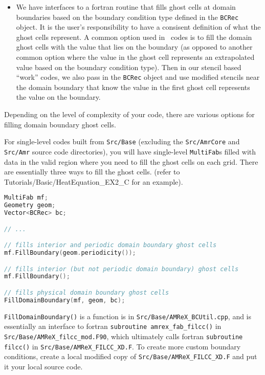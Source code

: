 \begin{itemize}
\item We have interfaces to a fortran routine that fills ghost cells at domain
boundaries based on the boundary condition type defined in the {\tt BCRec} object.
It is the user's responsibility to have a consisent definition of what the ghost cells
represent.  A common option used in \amrex\ codes is to fill the domain ghost cells
with the value that lies on the boundary (as opposed to another common option where
the value in the ghost cell represents an extrapolated value based on the boundary
condition type).  Then in our stencil based ``work'' codes, we also pass in the
{\tt BCRec} object and use modified stencils near the domain boundary that know the value
in the first ghost cell represents the value on the boundary.

\end{itemize}

Depending on the level of complexity of your code, there are various options
for filling domain boundary ghost cells.

For single-level codes built from {\tt Src/Base} (excluding the 
{\tt Src/AmrCore} and {\tt Src/Amr} source code directories), you will have 
single-level {\tt MultiFab}s filled with data in the valid region where you need 
to fill the ghost cells on each grid.  There are essentially three ways to fill the ghost 
cells. (refer to Tutorials/Basic/HeatEquation\_EX2\_C for an example).

\begin{lstlisting}[language=cpp]
MultiFab mf;
Geometry geom;
Vector<BCRec> bc;

// ...

// fills interior and periodic domain boundary ghost cells
mf.FillBoundary(geom.periodicity());

// fills interior (but not periodic domain boundary) ghost cells
mf.FillBoundary();

// fills physical domain boundary ghost cells
FillDomainBoundary(mf, geom, bc);
\end{lstlisting}

{\tt FillDomainBoundary()} is a function is in {\tt Src/Base/AMReX\_BCUtil.cpp},
and is essentially an interface to fortran {\tt subroutine amrex\_fab\_filcc()}
in {\tt Src/Base/AMReX\_filcc\_mod.F90}, which ultimately calls fortran 
{\tt subroutine filcc()} in {\tt Src/Base/AMReX\_FILCC\_XD.F}.  To create more
custom boundary conditions, create a local modified copy of
{\tt Src/Base/AMReX\_FILCC\_XD.F} and put it your local source code.

